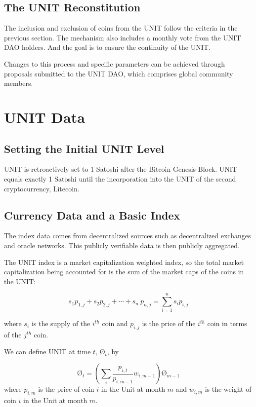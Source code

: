 \documentclass[12pt]{article}
\begin{document}
\subsection{The UNIT Reconstitution}

The inclusion and exclusion of coins from the UNIT follow the criteria in the previous section. The mechanism also includes a monthly vote from the UNIT DAO holders. And the goal is to ensure the continuity of the UNIT.

Changes to this process and specific parameters can be achieved through proposals submitted to the UNIT DAO, which comprises global community members.

\section{UNIT Data}
\label{sec:unitData}

\subsection{Setting the Initial UNIT Level}

UNIT is retroactively set to 1 Satoshi after the Bitcoin Genesis Block. UNIT equals exactly 1 Satoshi until the incorporation into the UNIT of the second cryptocurrency, Litecoin.

\subsection{Currency Data and a Basic Index}

The index data comes from decentralized sources such as decentralized exchanges and oracle networks. This publicly verifiable data is then publicly aggregated.

The UNIT index is a market capitalization weighted index, so the total market capitalization being accounted for is the sum of the market caps of the coins in the UNIT:

$$
s_1 p_{1,j}+s_2 p_{2,j}+ \cdots+ s_n\ p_{n,j} = \sum_{i=1}^{n} s_ip_{i,j}
$$

where $s_i$ is the supply of the $i^{th}$ coin and $p_{i,j}$ is the price of the $i^{th}$ coin in terms of the $j^{th}$ coin.

We can define UNIT at time $t$, $Ø_t$, by

  $$
Ø_t = \left(\sum_{i}\frac{p_{i,t}}{p_{i,m-1}} w_{i,m-1}\right) Ø_{m-1}
  $$
where $p_{i,m}$ is the price of coin $i$ in the Unit at month $m$ and $w_{i,m}$ is the weight of coin $i$ in the Unit at month $m$. 
\end{document}

